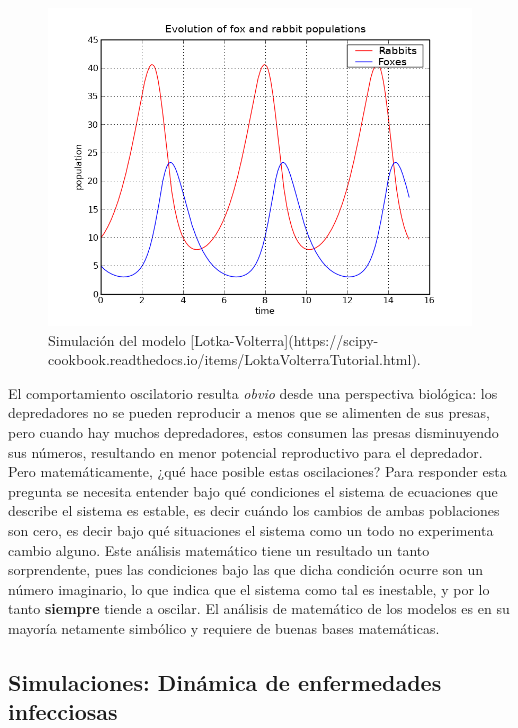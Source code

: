 \documentclass[
]{book}
\begin{document}
\begin{figure}

{\centering \includegraphics[width=11.11in]{Unidad-I/volterra} 

}

\caption{Simulación del modelo [Lotka-Volterra](https://scipy-cookbook.readthedocs.io/items/LoktaVolterraTutorial.html).}\label{fig:volterra}
\end{figure}

El comportamiento oscilatorio resulta \emph{obvio} desde una perspectiva biológica: los depredadores no se pueden reproducir a menos que se alimenten de sus presas, pero cuando hay muchos depredadores, estos consumen las presas disminuyendo sus números, resultando en menor potencial reproductivo para el depredador. Pero matemáticamente, ¿qué hace posible estas oscilaciones? Para responder esta pregunta se necesita entender bajo qué condiciones el sistema de ecuaciones que describe el sistema es estable, es decir cuándo los cambios de ambas poblaciones son cero, es decir bajo qué situaciones el sistema como un todo no experimenta cambio alguno. Este análisis matemático tiene un resultado un tanto sorprendente, pues las condiciones bajo las que dicha condición ocurre son un número imaginario, lo que indica que el sistema como tal es inestable, y por lo tanto \textbf{siempre} tiende a oscilar. El análisis de matemático de los modelos es en su mayoría netamente simbólico y requiere de buenas bases matemáticas.

\hypertarget{simulaciones-dinuxe1mica-de-enfermedades-infecciosas}{%
\subsection{Simulaciones: Dinámica de enfermedades infecciosas}\label{simulaciones-dinuxe1mica-de-enfermedades-infecciosas}}
\end{document}
